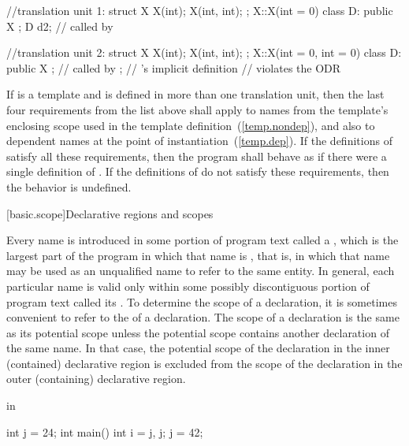 \begin{itemize}
\begin{codeblock}
//translation unit 1:
struct X {
	X(int);
	X(int, int);
};
X::X(int = 0) { }
class D: public X { };
D d2;                           //  called by 

//translation unit 2:
struct X {
	X(int);
	X(int, int);
};
X::X(int = 0, int = 0) { }
class D: public X { };          //  called by ;
                                // 's implicit definition
                                // violates the ODR
\end{codeblock}
\exitexampleb
If  is a template and is defined in more than one
translation unit, then the last four requirements from the list above
shall apply to names from the template's enclosing scope used in the
template definition~(\ref{temp.nondep}), and also to dependent names at
the point of instantiation~(\ref{temp.dep}). If the definitions of
 satisfy all these requirements, then the program shall behave
as if there were a single definition of . If the definitions of
 do not satisfy these requirements, then the behavior is
undefined.%
\end{itemize}

[basic.scope]{Declarative regions and scopes}%

\pnum
{}%
Every name is introduced in some portion of program text called a
%
%
, which is the largest part of the program
in which that name is , that is, in which that name may
be used as an unqualified name to refer to the same entity. In general,
each particular name is valid only within some possibly discontiguous
portion of program text called its . To determine the
scope of a declaration, it is sometimes convenient to refer to the
 of a declaration. The scope of a declaration
is the same as its potential scope unless the potential scope contains
another declaration of the same name. In that case, the potential scope
of the declaration in the inner (contained) declarative region is
excluded from the scope of the declaration in the outer (containing)
declarative region.

\pnum
\enterexample
in

\begin{codeblock}
int j = 24;
int main()
{
	int i = j, j;
	j = 42;
}
\end{codeblock}

